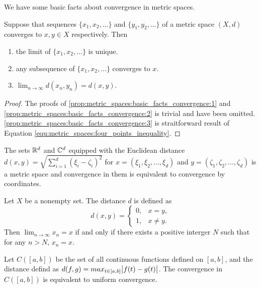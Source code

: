 We have some basic facts about convergence in metric spaces. 
\begin{prop}
\label{prop:metric_spaces:basic_facts_convergence}
Suppose that sequences $\{x_1, x_2, \ldots\}$ and $\{y_1, y_2, \ldots\}$ 
of a metric space $(X, d)$ converges to $x, y \in X$ respectively. Then
\begin{enumerate}
    \item \label{prop:metric_spaces:basic_facts_convergence:1}
    the limit of $\{x_1, x_2, \ldots\}$ is unique. 
    \item \label{prop:metric_spaces:basic_facts_convergence:2}
    any subsequence of $\{x_1, x_2, \ldots\}$ converges to $x$. 
    \item \label{prop:metric_spaces:basic_facts_convergence:3}
    $\lim_{n \to \infty} d(x_n, y_n) = d(x, y)$. 
\end{enumerate}
\end{prop}
\begin{proof}
The proofs of \ref{prop:metric_spaces:basic_facts_convergence:1} 
and \ref{prop:metric_spaces:basic_facts_convergence:2} is trivial 
and have been omitted. 
\ref{prop:metric_spaces:basic_facts_convergence:3} is straitforward result 
of Equation \ref{equ:metric_spaces:four_points_inequality}. 
\end{proof}

\begin{example}
The sets $\mathbb{R}^d$ and $\mathbb{C}^d$ equipped with the Euclidean distance $d(x, y) = 
\sqrt{\sum_{i=1}^d(\xi_i - \zeta_i)^2}$ for $x = (\xi_1, \xi_2, \ldots, 
\xi_d)$ and $y = (\zeta_1, \zeta_2, \ldots, \zeta_d)$ is a metric space and 
convergence in them is equivalent to convergence by coordinates. 
\end{example}

\begin{example}
Let $X$ be a nonempty set. 
The distance $d$ is defined as 
\begin{equation*}
    d(x, y) = \begin{cases}
        0, & x = y,  \\
        1, & x \neq y.
    \end{cases}
\end{equation*}
Then $\lim_{n \to \infty} x_n = x$ if and only if there exists a positive 
interger $N$ such that for any $n > N$, $x_n = x$. 
\end{example}

\begin{example}
\label{ex:metric_spaces:induction:cab}
Let $C([a, b])$ be the set of all continuous functions defined on $[a, b]$, 
and the distance defind as $d(f, g) = max_{t \in [a, b]} \abs{f(t) - g(t)}$. 
The convergence in $C([a, b])$ is equivalent to uniform convergence. 
\end{example}  

